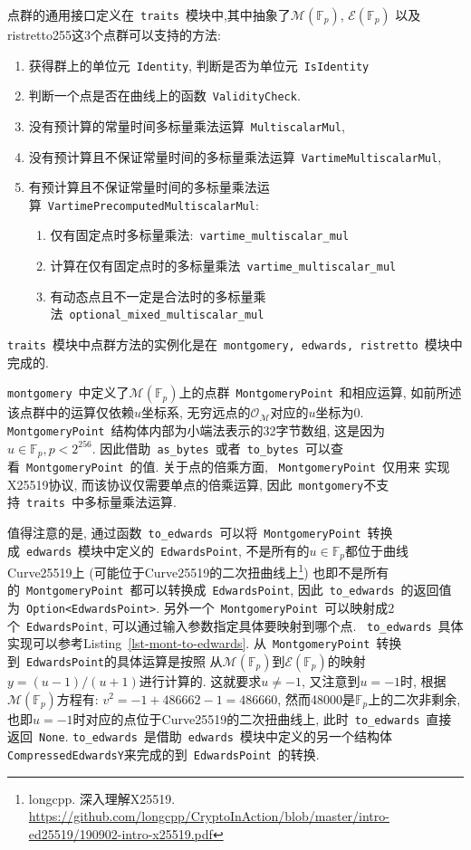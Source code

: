 \documentclass{article}
\newcommand{\F}{\mathbb{F}}
\newcommand{\code}[1]{\lstinline!#1!}
\begin{document}
点群的通用接口定义在~\code{traits}~模块中,其中抽象了$\mathcal{M}(\F_p)$, $\mathcal{E}(\F_p)$
以及\textsf{ristretto255}这3个点群可以支持的方法:
\begin{enumerate}
\item 获得群上的单位元~\code{Identity}, 判断是否为单位元~\code{IsIdentity}
\item 判断一个点是否在曲线上的函数~\code{ValidityCheck}.
\item 没有预计算的常量时间多标量乘法运算~\code{MultiscalarMul}, 
\item 没有预计算且不保证常量时间的多标量乘法运算~\code{VartimeMultiscalarMul}, 
\item 有预计算且不保证常量时间的多标量乘法运算~\code{VartimePrecomputedMultiscalarMul}:
	\begin{enumerate}
	\item 仅有固定点时多标量乘法:~\code{vartime_multiscalar_mul}
	\item 计算在仅有固定点时的多标量乘法~\code{vartime_multiscalar_mul}
	\item 有动态点且不一定是合法时的多标量乘法~\code{optional_mixed_multiscalar_mul}
	\end{enumerate}
\end{enumerate}
\code{traits}~模块中点群方法的实例化是在~\code{montgomery, edwards, ristretto}~模块中完成的.

\code{montgomery}~中定义了$\mathcal{M}(\F_p)$上的点群~\code{MontgomeryPoint}~和相应运算,
如前所述该点群中的运算仅依赖$u$坐标系, 无穷远点的$\mathcal{O}_{\mathcal{M}}$对应的$u$坐标为0.
\code{MontgomeryPoint}~结构体内部为小端法表示的32字节数组, 这是因为$u\in\F_p, p < 2^{256}$.
因此借助~\code{as_bytes}~或者~\code{to_bytes}~可以查看~\code{MontgomeryPoint}~的值.
关于点的倍乘方面, ~\code{MontgomeryPoint}~仅用来
实现X25519协议, 而该协议仅需要单点的倍乘运算,
因此~\code{montgomery}不支持~\code{traits}~中多标量乘法运算.

值得注意的是, 通过函数~\code{to_edwards}~可以将~\code{MontgomeryPoint}~转换
成~\code{edwards}~模块中定义的~\code{EdwardsPoint}, 
不是所有的$u\in\F_p$都位于曲线Curve25519上
(可能位于Curve25519的二次扭曲线上\footnote{longcpp. 深入理解X25519. 
\url{https://github.com/longcpp/CryptoInAction/blob/master/intro-ed25519/190902-intro-x25519.pdf}})
也即不是所有的~\code{MontgomeryPoint}~都可以转换成~\code{EdwardsPoint}, 
因此~\code{to_edwards}~的返回值为~\code{Option<EdwardsPoint>}.
另外一个~\code{MontgomeryPoint}~可以映射成2个~\code{EdwardsPoint},
可以通过输入参数指定具体要映射到哪个点. 
~\code{to_edwards}~具体实现可以参考Listing~\ref{lst-mont-to-edwards}.
从~\code{MontgomeryPoint}~转换到~\code{EdwardsPoint}的具体运算是按照
从$\mathcal{M}(\F_p)$到$\mathcal{E}(\F_p)$的映射$y = (u-1)/(u+1)$进行计算的.
这就要求$u\neq -1$, 又注意到$u = -1$时, 根据$\mathcal{M}(\F_p)$方程有:
$v^2 = -1 + 486662 - 1 = 486660$, 然而48000是$\F_p$上的二次非剩余,
也即$u = -1$时对应的点位于Curve25519的二次扭曲线上, 此时~\code{to_edwards}~直接返回~\code{None}.
\code{to_edwards}~是借助~\code{edwards}~模块中定义的另一个结构体
\code{CompressedEdwardsY}来完成的到~\code{EdwardsPoint}~的转换.
\end{document}
